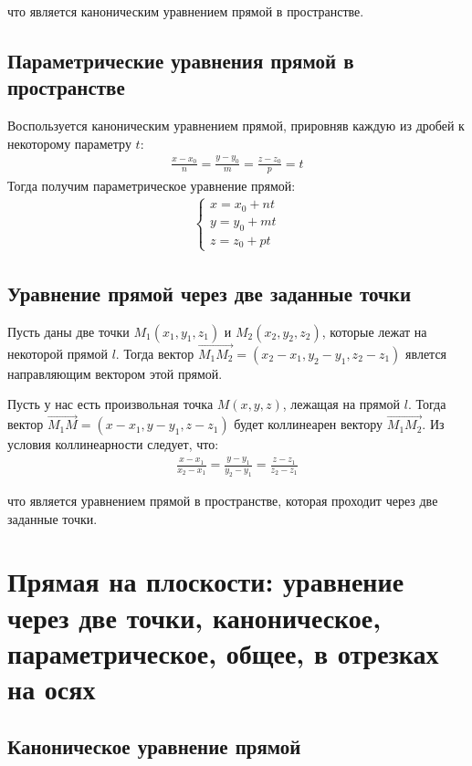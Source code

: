\documentclass[a4paper,12pt]{extbook}
\theoremstyle{named}
\theoremstyle{named}
\begin{document}
что является каноническим уравнением прямой в пространстве.

\subsection*{Параметрические уравнения прямой в пространстве}
Воспользуется каноническим уравнением прямой, прировняв каждую из дробей к некоторому параметру \(t\):
\begin{gather*}
    \frac{x - x_0}{n} = \frac{y - y_0}{m} = \frac{z - z_0}{p} = t
\end{gather*}
Тогда получим параметрическое уравнение прямой:
\begin{gather*}
    \begin{cases}
        x = x_0 + nt \\
        y = y_0 + mt \\
        z = z_0 + pt
    \end{cases}
\end{gather*}

\subsection*{Уравнение прямой через две заданные точки}
Пусть даны две точки \(M_1(x_1, y_1, z_1)\) и \(M_2(x_2, y_2, z_2)\), которые лежат на некоторой прямой \(l\). Тогда вектор  \(\overrightarrow{M_1M_2} = (x_2 - x_1, y_2 - y_1, z_2 - z_1)\) явлется направляющим вектором этой прямой.

Пусть у нас есть произвольная точка \(M(x, y, z)\), лежащая на прямой \(l\). Тогда вектор \(\overrightarrow{M_1M} = (x - x_1, y - y_1, z - z_1)\) будет коллинеарен вектору \(\overrightarrow{M_1M_2}\). Из условия коллинеарности следует, что:
\begin{gather*}
    \frac{x - x_1}{x_2 - x_1} = \frac{y - y_1}{y_2 - y_1} = \frac{z - z_1}{z_2 - z_1}
\end{gather*}

что является уравнением прямой в пространстве, которая проходит через две заданные точки.



\section{Прямая на плоскости: уравнение через две точки, каноническое, параметрическое, общее, в отрезках на осях}\label{sec:line_on_plane}

\subsection*{Каноническое уравнение прямой}
\end{document}
